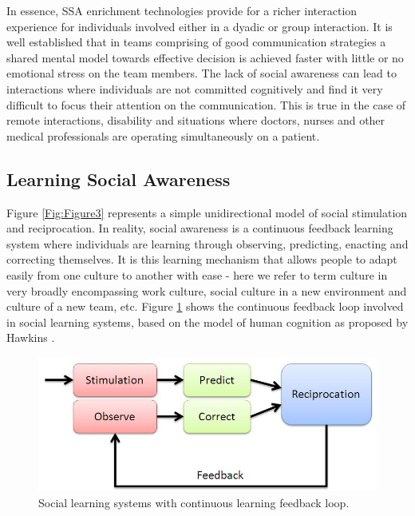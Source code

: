 \documentclass[oneside,11pt]{memoir}
\begin{document}
In essence, SSA enrichment technologies provide for a richer interaction experience for individuals involved either in a dyadic or group interaction. It is well established that in teams comprising of good communication strategies a shared mental model towards effective decision is achieved faster with little or no emotional stress on the team members. The lack of social awareness can lead to interactions where individuals are not committed cognitively and find it very difficult to focus their attention on the communication. This is true in the case of remote interactions, disability and situations where doctors, nurses and other medical professionals are operating simultaneously on a patient.

\subsection{Learning Social Awareness}
Figure \ref{Fig:Figure3} represents a simple unidirectional model of social stimulation and reciprocation. In reality, social awareness is a continuous feedback learning system where individuals are learning through observing, predicting, enacting and correcting themselves. It is this learning mechanism that allows people to adapt easily from one culture to another with ease - here we refer to term culture in very broadly encompassing work culture, social culture in a new environment and culture of a new team, etc. Figure \ref{Fig:Figure4} shows the continuous feedback loop involved in social learning systems, based on the model of human cognition as proposed by Hawkins \cite{hawkins_intelligence_2004}.

\begin{figure}[h]
\begin{center}
 \includegraphics[width=4.5in]{SSALearning.jpg}
\caption{Social learning systems with continuous learning feedback loop.}
\label{Fig:Figure4}
\end{center}
\end{figure}
\end{document}

